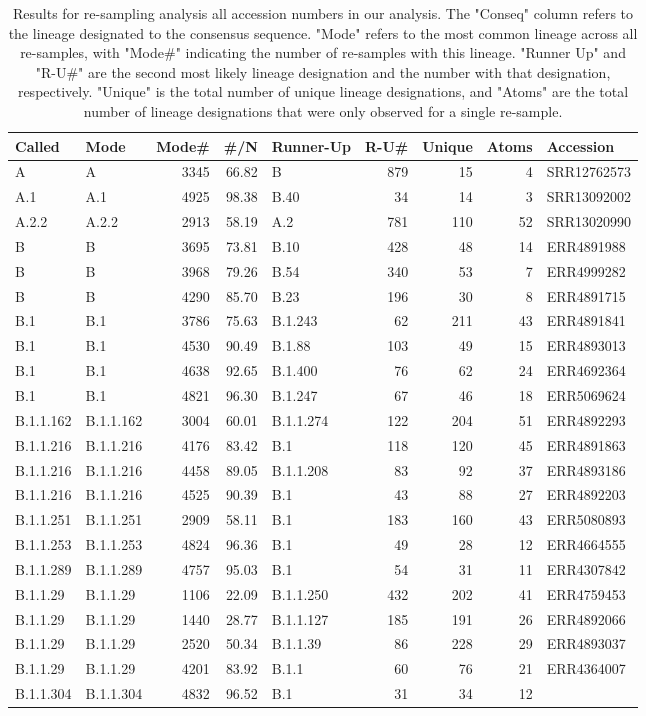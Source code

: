 \documentclass[
]{article}
\begin{document}
\begin{longtable}[]{@{}llrrlrrrl@{}}
\caption{\label{tab:pango}Results for re-sampling analysis all accession numbers in our analysis. The "Conseq" column refers to the lineage designated to the consensus sequence. "Mode" refers to the most common lineage across all re-samples, with "Mode\#" indicating the number of re-samples with this lineage. "Runner Up" and "R-U\#" are the second most likely lineage designation and the number with that designation, respectively. "Unique" is the total number of unique lineage designations, and "Atoms" are the total number of lineage designations that were only observed for a single re-sample.}\\
\toprule
Called & Mode & Mode\# & \#/N & Runner-Up & R-U\# & Unique & Atoms & Accession\tabularnewline
\midrule
\endhead
A & A & 3345 & 66.82 & B & 879 & 15 & 4 & SRR12762573\tabularnewline
A.1 & A.1 & 4925 & 98.38 & B.40 & 34 & 14 & 3 &
SRR13092002\tabularnewline
A.2.2 & A.2.2 & 2913 & 58.19 & A.2 & 781 & 110 & 52 &
SRR13020990\tabularnewline
B & B & 3695 & 73.81 & B.10 & 428 & 48 & 14 & ERR4891988\tabularnewline
B & B & 3968 & 79.26 & B.54 & 340 & 53 & 7 & ERR4999282\tabularnewline
B & B & 4290 & 85.70 & B.23 & 196 & 30 & 8 & ERR4891715\tabularnewline
B.1 & B.1 & 3786 & 75.63 & B.1.243 & 62 & 211 & 43 &
ERR4891841\tabularnewline
B.1 & B.1 & 4530 & 90.49 & B.1.88 & 103 & 49 & 15 &
ERR4893013\tabularnewline
B.1 & B.1 & 4638 & 92.65 & B.1.400 & 76 & 62 & 24 &
ERR4692364\tabularnewline
B.1 & B.1 & 4821 & 96.30 & B.1.247 & 67 & 46 & 18 &
ERR5069624\tabularnewline
B.1.1.162 & B.1.1.162 & 3004 & 60.01 & B.1.1.274 & 122 & 204 & 51 &
ERR4892293\tabularnewline
B.1.1.216 & B.1.1.216 & 4176 & 83.42 & B.1 & 118 & 120 & 45 &
ERR4891863\tabularnewline
B.1.1.216 & B.1.1.216 & 4458 & 89.05 & B.1.1.208 & 83 & 92 & 37 &
ERR4893186\tabularnewline
B.1.1.216 & B.1.1.216 & 4525 & 90.39 & B.1 & 43 & 88 & 27 &
ERR4892203\tabularnewline
B.1.1.251 & B.1.1.251 & 2909 & 58.11 & B.1 & 183 & 160 & 43 &
ERR5080893\tabularnewline
B.1.1.253 & B.1.1.253 & 4824 & 96.36 & B.1 & 49 & 28 & 12 &
ERR4664555\tabularnewline
B.1.1.289 & B.1.1.289 & 4757 & 95.03 & B.1 & 54 & 31 & 11 &
ERR4307842\tabularnewline
B.1.1.29 & B.1.1.29 & 1106 & 22.09 & B.1.1.250 & 432 & 202 & 41 &
ERR4759453\tabularnewline
B.1.1.29 & B.1.1.29 & 1440 & 28.77 & B.1.1.127 & 185 & 191 & 26 &
ERR4892066\tabularnewline
B.1.1.29 & B.1.1.29 & 2520 & 50.34 & B.1.1.39 & 86 & 228 & 29 &
ERR4893037\tabularnewline
B.1.1.29 & B.1.1.29 & 4201 & 83.92 & B.1.1 & 60 & 76 & 21 &
ERR4364007\tabularnewline
B.1.1.304 & B.1.1.304 & 4832 & 96.52 & B.1 & 31 & 34 & 12 &

\end{longtable}
\end{document}
